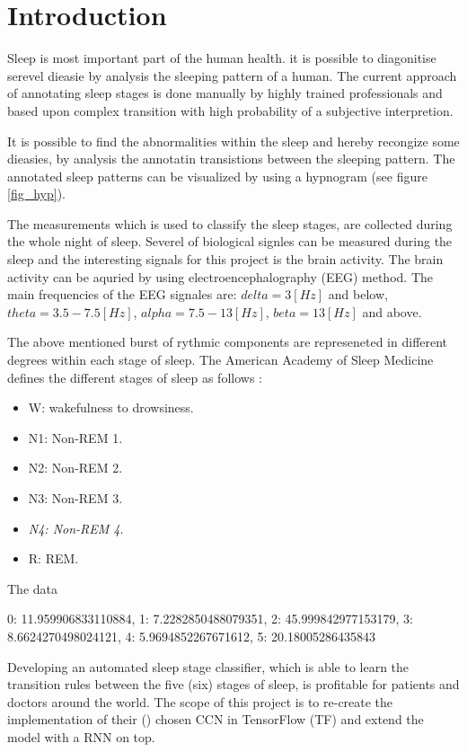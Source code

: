 \section{Introduction}
\label{sec:intro}

Sleep is most important part of the human health. it is possible to diagonitise serevel dieasie by analysis the sleeping pattern of a human. 
The current approach of annotating sleep stages is done manually by highly trained professionals and based upon complex transition with high probability of a subjective interpretion.

It is possible to find the abnormalities within the sleep and hereby recongize some dieasies, by analysis the annotatin transistions between the sleeping pattern. The annotated sleep patterns can be visualized by using a hypnogram (see figure \ref{fig_hyp}).

The measurements which is used to classify the sleep stages, are collected during the whole night  of sleep. Severel of biological signles can be measured during the sleep and the interesting signals for this project is the brain activity. The brain activity can be aquried by using electroencephalography (EEG) method. 
The main frequencies of the EEG signales are: $delta= 3 \left[ Hz \right]$ and below, 
$theta= 3.5-7.5 \left[ Hz \right]$,
$alpha= 7.5-13 \left[ Hz \right]$, 
$beta= 13 \left[ Hz \right]$ and above.

The above mentioned burst of rythmic components are represeneted in different degrees within each stage of sleep.   
The American Academy of Sleep Medicine defines the different stages of sleep as follows \cite{AASM}: 
\begin{itemize}
\item W: wakefulness to drowsiness. 
\item N1: Non-REM 1.
\item N2: Non-REM 2.
\item N3: Non-REM 3.
\item \textit{N4: Non-REM 4}.
\item R: REM.
\end{itemize}



The data


{0: 11.959906833110884,
 1: 7.2282850488079351,
 2: 45.999842977153179,
 3: 8.6624270498024121,
 4: 5.9694852267671612,
 5: 20.18005286435843}


Developing an automated sleep stage classifier, which is able to learn the transition rules between the five (six) stages of sleep, is profitable for patients and doctors around the world. 
The scope of this project is to re-create the implementation of their (\cite{main_ar}) chosen CCN in TensorFlow (TF) and extend the model with a RNN on top. 


